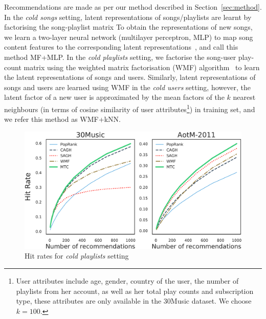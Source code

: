\begin{itemize}
      Recommendations are made as per our method described in Section~\ref{sec:method}.
      In the \emph{cold songs} setting, latent representations of songs/playlists are learnt by factorising the song-playlist matrix  
      To obtain the representations of new songs, we learn a two-layer neural network (multilayer perceptron, MLP) to map song 
      content features to the corresponding latent representations~\cite{Gantner:2010,van2013deep}, and call this method MF+MLP. 
      In the \emph{cold playlists} setting, we factorise the song-user play-count matrix using the weighted matrix factorisation (WMF) 
      algorithm~\cite{hu2008collaborative,van2013deep} to learn the latent representations of songs and users.
      Similarly, latent representations of songs and users are learned using WMF in the \emph{cold users} setting, however, the latent 
      factor of a new user is approximated by the mean factors of the $k$ nearest neighbours (in terms of cosine similarity of user 
      attributes\footnote{User attributes include age, gender, country of the user, the number of playlists from her account, as well as 
      her total play counts and subscription type, these attributes are only available in the 30Music dataset. We choose $k=100$.}) 
      in training set, and we refer this method as WMF+kNN.
\end{itemize}


\begin{figure}[!t]
    \centering
    \includegraphics[width=\columnwidth]{fig/hr3.pdf}
    \caption{Hit rates for \emph{cold playlists} setting}
\end{figure}


